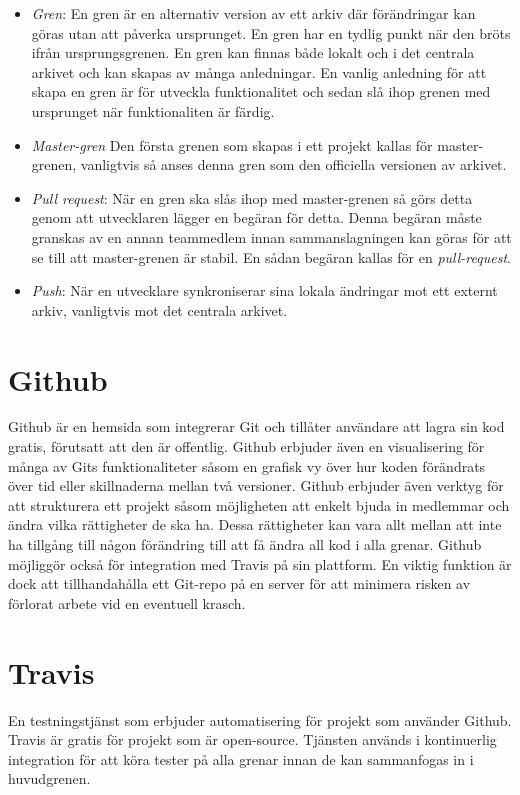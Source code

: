 \begin{itemize}
	\item \textit{Gren}: En gren är en alternativ version av ett arkiv där förändringar kan göras utan att påverka ursprunget. En gren har en tydlig punkt när den bröts ifrån ursprungsgrenen. En gren kan finnas både lokalt och i det centrala arkivet och kan skapas av många anledningar. En vanlig anledning för att skapa en gren är för utveckla funktionalitet och sedan slå ihop grenen med ursprunget när funktionaliten är färdig.

	\item\textit{Master-gren} Den första grenen som skapas i ett projekt kallas för master-grenen, vanligtvis så anses denna gren som den officiella versionen av arkivet.

	\item \textit{Pull request}: När en gren ska slås ihop med master-grenen så görs detta genom att utvecklaren lägger en begäran för detta. Denna begäran måste granskas av en annan teammedlem innan sammanslagningen kan göras för att se till att master-grenen är stabil. En sådan begäran kallas för en \textit{pull-request}.

	\item \textit{Push}: När en utvecklare synkroniserar sina lokala ändringar mot ett externt arkiv, vanligtvis mot det centrala arkivet.
\end{itemize}


\section{Github}
Github är en hemsida som integrerar Git och tillåter användare att lagra sin kod gratis, förutsatt att den är offentlig. Github erbjuder även en visualisering för många av Gits funktionaliteter såsom en grafisk vy över hur koden förändrats över tid eller skillnaderna mellan två versioner. Github erbjuder även verktyg för att strukturera ett projekt såsom möjligheten att enkelt bjuda in medlemmar och ändra vilka rättigheter de ska ha. Dessa rättigheter kan vara allt mellan att inte ha tillgång till någon förändring till att få ändra all kod i alla grenar. Github möjliggör också för integration med Travis på sin plattform. En viktig funktion är dock att tillhandahålla ett Git-repo på en server för att minimera risken av förlorat arbete vid en eventuell krasch. \cite{Github}

\section{Travis}
En testningstjänst som erbjuder automatisering för projekt som använder Github. Travis är gratis för projekt som är open-source. Tjänsten används i kontinuerlig integration för att köra tester på alla grenar innan de kan sammanfogas in i huvudgrenen. \cite{Travis}


